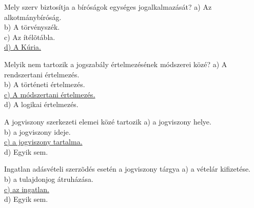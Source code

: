 \begin{frame}

\begin{tcolorbox}[title={33. Kérdés}]
Mely szerv biztosítja a bíróságok egységes jogalkalmazását?
\tcblower
a) Az alkotmánybíróság.\\
b) A törvényszék.\\
c) Az ítélõtábla.\\
\uline {d) A Kúria.}
\end{tcolorbox}

\begin{tcolorbox}[title={34. Kérdés}]
Melyik nem tartozik a jogszabály értelmezésének módszerei közé?
\tcblower
a) A rendszertani értelmezés.\\
b) A történeti értelmezés.\\
\uline {c) A módszertani értelmezés.}\\
d) A logikai értelmezés.
\end{tcolorbox}

\begin{tcolorbox}[title={35. Kérdés}]
A jogviszony szerkezeti elemei közé tartozik
\tcblower
a) a jogviszony helye.\\
b) a jogviszony ideje.\\
\uline {c) a jogviszony tartalma.}\\
d) Egyik sem.
\end{tcolorbox}

\begin{tcolorbox}[title={36. Kérdés}]
Ingatlan adásvételi szerzõdés esetén a jogviszony tárgya
\tcblower
a) a vételár kifizetése.\\
b) a tulajdonjog átruházása.\\
\uline {c) az ingatlan.}\\
d) Egyik sem.
\end{tcolorbox}

\end{frame}



